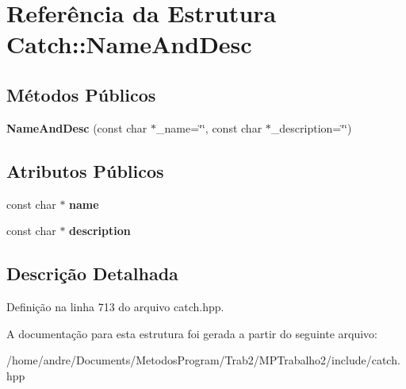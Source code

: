 \hypertarget{structCatch_1_1NameAndDesc}{}\section{Referência da Estrutura Catch\+:\+:Name\+And\+Desc}
\label{structCatch_1_1NameAndDesc}
\subsection*{Métodos Públicos}
\begin{DoxyCompactItemize}
\item 
{\bfseries Name\+And\+Desc} (const char $\ast$\+\_\+name=\char`\"{}\char`\"{}, const char $\ast$\+\_\+description=\char`\"{}\char`\"{})\hypertarget{structCatch_1_1NameAndDesc_a189ceb9942fb5f6635140d6a09fc843a}{}\label{structCatch_1_1NameAndDesc_a189ceb9942fb5f6635140d6a09fc843a}

\end{DoxyCompactItemize}
\subsection*{Atributos Públicos}
\begin{DoxyCompactItemize}
\item 
const char $\ast$ {\bfseries name}\hypertarget{structCatch_1_1NameAndDesc_a374b4ed8be3cf98be20ebde5273bde51}{}\label{structCatch_1_1NameAndDesc_a374b4ed8be3cf98be20ebde5273bde51}

\item 
const char $\ast$ {\bfseries description}\hypertarget{structCatch_1_1NameAndDesc_a3463a23ff65ce494fc380452b57b7970}{}\label{structCatch_1_1NameAndDesc_a3463a23ff65ce494fc380452b57b7970}

\end{DoxyCompactItemize}


\subsection{Descrição Detalhada}


Definição na linha 713 do arquivo catch.\+hpp.



A documentação para esta estrutura foi gerada a partir do seguinte arquivo\+:\begin{DoxyCompactItemize}
\item 
/home/andre/\+Documents/\+Metodos\+Program/\+Trab2/\+M\+P\+Trabalho2/include/catch.\+hpp\end{DoxyCompactItemize}

